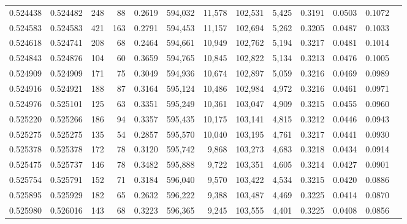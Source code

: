 \begin{tabular}{rrrrrrrrrrrrr}
0.524438 & 0.524482 &   248 &    88 &                                     0.2619 & 594,032 &  11,578 & 102,531 &   5,425 & 0.3191 & 0.0503 & 0.1072 \\
0.524583 & 0.524583 &   421 &   163 &                                     0.2791 & 594,453 &  11,157 & 102,694 &   5,262 & 0.3205 & 0.0487 & 0.1033 \\
0.524618 & 0.524741 &   208 &    68 &                                     0.2464 & 594,661 &  10,949 & 102,762 &   5,194 & 0.3217 & 0.0481 & 0.1014 \\
0.524843 & 0.524876 &   104 &    60 &                                     0.3659 & 594,765 &  10,845 & 102,822 &   5,134 & 0.3213 & 0.0476 & 0.1005 \\
0.524909 & 0.524909 &   171 &    75 &                                     0.3049 & 594,936 &  10,674 & 102,897 &   5,059 & 0.3216 & 0.0469 & 0.0989 \\
0.524916 & 0.524921 &   188 &    87 &                                     0.3164 & 595,124 &  10,486 & 102,984 &   4,972 & 0.3216 & 0.0461 & 0.0971 \\
0.524976 & 0.525101 &   125 &    63 &                                     0.3351 & 595,249 &  10,361 & 103,047 &   4,909 & 0.3215 & 0.0455 & 0.0960 \\
0.525220 & 0.525266 &   186 &    94 &                                     0.3357 & 595,435 &  10,175 & 103,141 &   4,815 & 0.3212 & 0.0446 & 0.0943 \\
0.525275 & 0.525275 &   135 &    54 &                                     0.2857 & 595,570 &  10,040 & 103,195 &   4,761 & 0.3217 & 0.0441 & 0.0930 \\
0.525378 & 0.525378 &   172 &    78 &                                     0.3120 & 595,742 &   9,868 & 103,273 &   4,683 & 0.3218 & 0.0434 & 0.0914 \\
0.525475 & 0.525737 &   146 &    78 &                                     0.3482 & 595,888 &   9,722 & 103,351 &   4,605 & 0.3214 & 0.0427 & 0.0901 \\
0.525754 & 0.525791 &   152 &    71 &                                     0.3184 & 596,040 &   9,570 & 103,422 &   4,534 & 0.3215 & 0.0420 & 0.0886 \\
0.525895 & 0.525929 &   182 &    65 &                                     0.2632 & 596,222 &   9,388 & 103,487 &   4,469 & 0.3225 & 0.0414 & 0.0870 \\
0.525980 & 0.526016 &   143 &    68 &                                     0.3223 & 596,365 &   9,245 & 103,555 &   4,401 & 0.3225 & 0.0408 & 0.0856 \\

\end{tabular}
